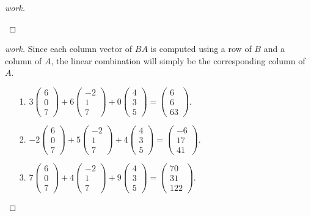 \begin{question}{1.3}{}
{\begin{enumerate}
\begin{proof}[work]
\begin{enumerate}
        \end{enumerate}
      \end{proof}
      \begin{proof}[work] Since each column vector of $BA$ is computed using a row of $B$ and a column of $A$, the linear combination will simply be the corresponding column of $A$.
        \begin{enumerate}
          \item[1.] $3\begin{pmatrix}6 \\ 0 \\ 7\end{pmatrix} + 6\begin{pmatrix}-2 \\ 1 \\ 7\end{pmatrix} + 0\begin{pmatrix}4 \\ 3 \\ 5\end{pmatrix} = \begin{pmatrix}6 \\ 6 \\ 63\end{pmatrix}$.
          \item[2.] $-2\begin{pmatrix}6 \\ 0 \\ 7\end{pmatrix} + 5\begin{pmatrix}-2 \\ 1 \\ 7\end{pmatrix} + 4\begin{pmatrix}4 \\ 3 \\ 5\end{pmatrix} = \begin{pmatrix}-6 \\ 17 \\ 41\end{pmatrix}$.
          \item[3.] $7\begin{pmatrix}6 \\ 0 \\ 7\end{pmatrix} + 4\begin{pmatrix}-2 \\ 1 \\ 7\end{pmatrix} + 9\begin{pmatrix}4 \\ 3 \\ 5\end{pmatrix} = \begin{pmatrix}70 \\ 31 \\ 122\end{pmatrix}$.

\end{enumerate}
\end{proof}
\end{enumerate}}
\end{question}
